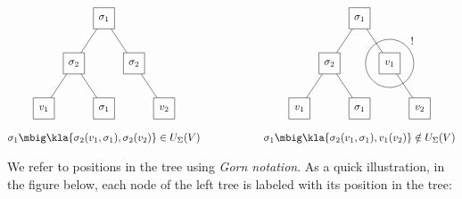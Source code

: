 \[\begin{matrix}
 \begin{tikzpicture}[every node/.style={rectangle,draw,minimum size=2em},baseline=(current bounding box.center)]
  \node (n)   at (+0,+0.0) { $\sigma_1$ };
  \node (n1)  at (-1,-1.5) { $\sigma_2$ } edge (n);
  \node (n2)  at (+1,-1.5) { $\sigma_2$ } edge (n);
  \node (n11) at (-2,-3.0) { $v_1$ } edge (n1);
  \node (n12) at (+0,-3.0) { $\sigma_1$ } edge (n1);
  \node (n21) at (+2,-3.0) { $v_2$ } edge (n2);
 \end{tikzpicture}
 &\hspace*{4em}&
 \begin{tikzpicture}[every node/.style={rectangle,draw,minimum size=2em},baseline=(current bounding box.center)]
  \node (n)   at (+0,+0.0) { $\sigma_1$ };
  \node (n1)  at (-1,-1.5) { $\sigma_2$ } edge (n);
  \node (n2)  at (+1,-1.5) { $v_1$ } edge (n);
  \node (n11) at (-2,-3.0) { $v_1$ } edge (n1);
  \node (n12) at (+0,-3.0) { $\sigma_1$ } edge (n1);
  \node (n21) at (+2,-3.0) { $v_2$ } edge (n2);
  \draw (n2) circle (0.8);
  \node[draw=none] at (+1.75,-0.75) {!};
 \end{tikzpicture}
 \\\\
 \sigma_1\mbig\kla{\sigma_2(v_1,\sigma_1), \sigma_2(v_2)} \in U_\Sigma(V) &&
 \sigma_1\mbig\kla{\sigma_2(v_1,\sigma_1), v_1(v_2)} \notin U_\Sigma(V)
\end{matrix}\]

We refer to positions in the tree using \emph{Gorn notation}. As a quick
illustration, in the figure below, each node of the left tree is labeled with
its position in the tree:

